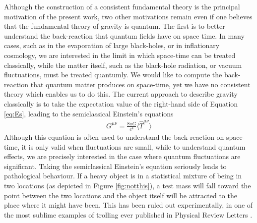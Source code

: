 \documentclass[aps,pra,showpacs,citeautoscript,amsmath,amssymb,floatfix,superscriptaddress,bbm, verbatim,amsfonts,changes,11pt,nofootinbib,longbibliography]{revtex4-2}
\begin{document}
Although the construction of a consistent fundamental theory is the principal motivation of the present work, two other motivations remain even if one believes that the fundamental theory of gravity is quantum. The first is to better understand the back-reaction that quantum fields have on space time. In many cases, such as in the evaporation of large black-holes, or in inflationary cosmology, we are interested in the limit in which space-time can be treated classically, while the matter itself, such as the black-hole radiation, or vacuum fluctuations, must be treated quantumly. We would like to compute the back-reaction that quantum matter produces on space-time, yet we have no consistent theory which enables us to do this. The current approach to describe gravity classically is to take the expectation value of the right-hand side of Equation \eqref{eq:Es}, leading to the  semiclassical Einstein's %
equations \cite{sato1950attempt,moller1962energy,rosenfeld1963quantization}
\begin{align}
G^{\mu\nu}
=\frac{8\pi G}{c^4}\langle{\hat T}^{\mu\nu}\rangle
\label{eq:semi}
\end{align}
Although this equation is often used to understand the back-reaction on space-time, it is only valid when fluctuations are small, while to understand quantum effects, we are precisely interested in the case where quantum fluctuations are significant. 
Taking the semiclassical Einstein's equation seriously leads to pathological behaviour. If a heavy object is in a statistical mixture of being in two locations (as depicted in Figure \ref{fig:notthis}), a test mass will fall toward the point between the two locations and the object itself will be attracted to the place where it might have been. This has been ruled out experimentally, in one of the most sublime  examples of trolling ever published in Physical Review Letters \cite{page1981indirect}. %
\end{document}

